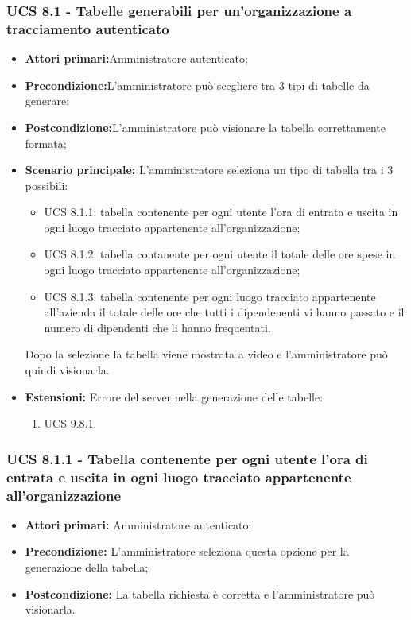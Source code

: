 \subsubsection{UCS 8.1 - Tabelle generabili per un'organizzazione a tracciamento autenticato}%
\begin{itemize}
\item \textbf{Attori primari:}Amministratore autenticato;
\item \textbf{Precondizione:}L'amministratore può scegliere tra 3 tipi di tabelle da generare;
\item \textbf{Postcondizione:}L'amministratore può visionare la tabella correttamente formata;
\item \textbf{Scenario principale:} L'amministratore seleziona un tipo di tabella tra i 3 possibili:
	\begin{itemize}%
	\item UCS 8.1.1: tabella contenente per ogni utente l'ora di entrata e uscita in ogni luogo tracciato appartenente all'organizzazione;
	\item UCS 8.1.2: tabella contanente per ogni utente il totale delle ore spese in ogni luogo tracciato appartenente all'organizzazione;
	\item UCS 8.1.3: tabella contenente per ogni luogo tracciato appartenente all'azienda il totale delle ore che tutti i dipendenenti vi hanno passato e il numero di dipendenti che li hanno frequentati.
\end{itemize}
Dopo la selezione la tabella viene mostrata a video e l'amministratore può quindi visionarla.
\item \textbf{Estensioni:} Errore del server nella generazione delle tabelle:
	\begin{enumerate}
		\item UCS 9.8.1.
	\end{enumerate}
\end{itemize}

\subsubsection{UCS 8.1.1 - Tabella contenente per ogni utente l'ora di entrata e uscita in ogni luogo tracciato appartenente all'organizzazione}%
\begin{itemize}
\item \textbf{Attori primari:} Amministratore autenticato;
\item \textbf{Precondizione:} L'amministratore seleziona questa opzione per la generazione della tabella;
\item \textbf{Postcondizione:} La tabella richiesta è corretta e l'amministratore può visionarla.
\end{itemize}

